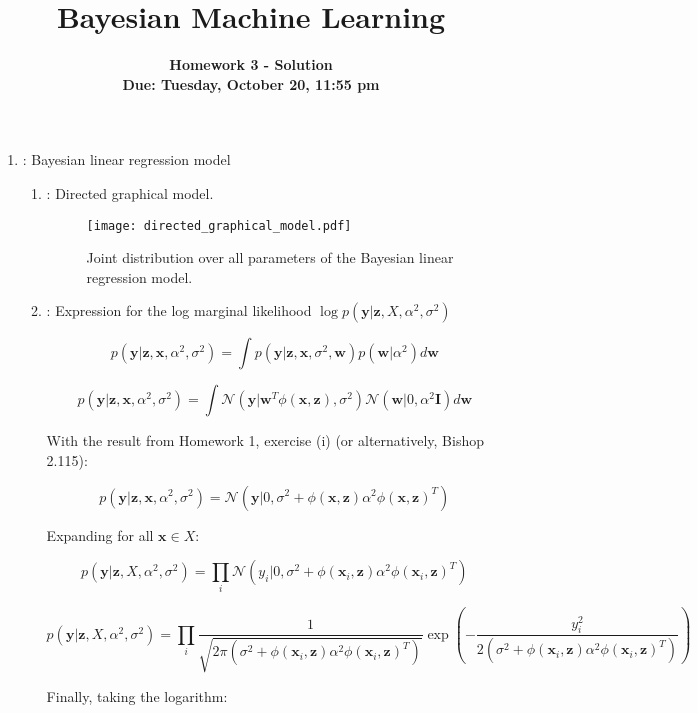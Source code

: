 \documentclass[11pt]{article}
\title{\vspace{-20mm} Bayesian Machine Learning}
\date{}
\author{
\textbf{Homework 3 - Solution}  \\ \textbf{Due: Tuesday, October 20, 11:55 pm}}
\newcommand{\ind}{\ensuremath{\mathbf{I}}}
\newcommand{\normal}{\mathcal{N}}
\newcommand{\mbf}[1]{{\boldsymbol{\mathbf{#1}}}}
\renewcommand{\bm}{\mbf}
\begin{document}
\maketitle

\begin{enumerate}
    \item: Bayesian linear regression model
    \begin{enumerate}[label=(\alph*)]
        \item: Directed graphical model.

            \begin{figure}[htbp]
            \centering
            \texttt{[image: directed\_graphical\_model.pdf]}
            \caption{Joint distribution over all parameters of the Bayesian linear regression model.}
            \end{figure}

        \item: Expression for the log marginal likelihood $\log p(\bm{y} | \bm{z}, X, \alpha^2, \sigma^2)$

            $$
            p(\bm{y}|\bm{z}, \bm{x}, \alpha^2, \sigma^2) = \int p(\bm{y}|\bm{z}, \bm{x}, \sigma^2, \bm{w}) p(\bm{w} | \alpha^2) d\bm{w}
            $$

            $$
            p(\bm{y}|\bm{z}, \bm{x}, \alpha^2, \sigma^2) = \int \normal(\bm{y}|\bm{w}^T \phi(\bm{x}, \bm{z}), \sigma^2) \normal(\bm{w}|0, \alpha^2 \ind) d\bm{w}
            $$

            With the result from Homework 1, exercise (i) (or alternatively, Bishop 2.115):

            $$
            p(\bm{y}|\bm{z}, \bm{x}, \alpha^2, \sigma^2) = \normal(\bm{y}|0, \sigma^2 + \phi(\bm{x}, \bm{z}) \alpha^2 \phi(\bm{x}, \bm{z})^T)
            $$

            Expanding for all $\bm{x} \in X$:

            $$
            p(\bm{y}|\bm{z}, X, \alpha^2, \sigma^2) = \prod_{i} \normal(y_i|0, \sigma^2 + \phi(\bm{x}_i, \bm{z}) \alpha^2 \phi(\bm{x}_i, \bm{z})^T)
            $$

            $$
            p(\bm{y}|\bm{z}, X, \alpha^2, \sigma^2) = \prod_{i} \dfrac{1}{\sqrt{2\pi(\sigma^2 + \phi(\bm{x}_i, \bm{z}) \alpha^2 \phi(\bm{x}_i, \bm{z})^T)}} \exp (-\dfrac{y_i^2}{2(\sigma^2 + \phi(\bm{x}_i, \bm{z}) \alpha^2 \phi(\bm{x}_i, \bm{z})^T)})
            $$

            Finally, taking the logarithm:


\end{enumerate}
\end{enumerate}
\end{document}
